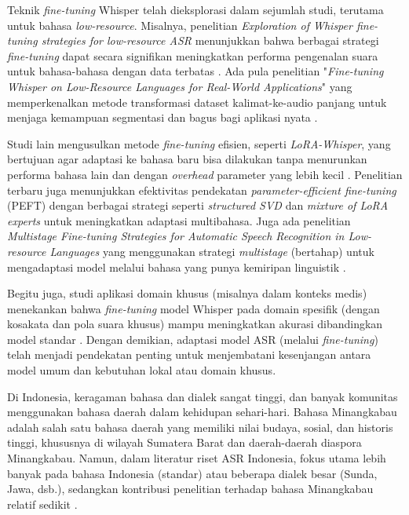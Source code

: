 Teknik \textit{fine-tuning} Whisper telah dieksplorasi dalam sejumlah studi, terutama untuk bahasa \textit{low-resource}. Misalnya, penelitian \textit{Exploration of Whisper fine-tuning strategies for low-resource ASR} menunjukkan bahwa berbagai strategi \textit{fine-tuning} dapat secara signifikan meningkatkan performa pengenalan suara untuk bahasa-bahasa dengan data terbatas \cite{liu2024exploration}. Ada pula penelitian "\textit{Fine-tuning Whisper on Low-Resource Languages for Real-World Applications}" yang memperkenalkan metode transformasi dataset kalimat-ke-audio panjang untuk menjaga kemampuan segmentasi dan bagus bagi aplikasi nyata \cite{timmel2024finetune}. \par

Studi lain mengusulkan metode \textit{fine-tuning} efisien, seperti \textit{LoRA-Whisper}, yang bertujuan agar adaptasi ke bahasa baru bisa dilakukan tanpa menurunkan performa bahasa lain dan dengan \textit{overhead} parameter yang lebih kecil \cite{song2024lorawhisper}. Penelitian terbaru juga menunjukkan efektivitas pendekatan \textit{parameter-efficient fine-tuning} (PEFT) dengan berbagai strategi seperti \textit{structured SVD} \cite{wang2025ssvd} dan \textit{mixture of LoRA experts} \cite{bagat2025mixture} untuk meningkatkan adaptasi multibahasa. Juga ada penelitian \textit{Multistage Fine-tuning Strategies for Automatic Speech Recognition in Low-resource Languages} yang menggunakan strategi \textit{multistage} (bertahap) untuk mengadaptasi model melalui bahasa yang punya kemiripan linguistik \cite{pillai2024multistage}. \par

Begitu juga, studi aplikasi domain khusus (misalnya dalam konteks medis) menekankan bahwa \textit{fine-tuning} model Whisper pada domain spesifik (dengan kosakata dan pola suara khusus) mampu meningkatkan akurasi dibandingkan model standar \cite{banerjee2024unitedmedasr}. Dengan demikian, adaptasi model ASR (melalui \textit{fine-tuning}) telah menjadi pendekatan penting untuk menjembatani kesenjangan antara model umum dan kebutuhan lokal atau domain khusus. \par

Di Indonesia, keragaman bahasa dan dialek sangat tinggi, dan banyak komunitas menggunakan bahasa daerah dalam kehidupan sehari-hari. Bahasa Minangkabau adalah salah satu bahasa daerah yang memiliki nilai budaya, sosial, dan historis tinggi, khususnya di wilayah Sumatera Barat dan daerah-daerah diaspora Minangkabau. Namun, dalam literatur riset ASR Indonesia, fokus utama lebih banyak pada bahasa Indonesia (standar) atau beberapa dialek besar (Sunda, Jawa, dsb.), sedangkan kontribusi penelitian terhadap bahasa Minangkabau relatif sedikit \cite{koto2020minangkabau,nasution2024chatgpt}. \par

